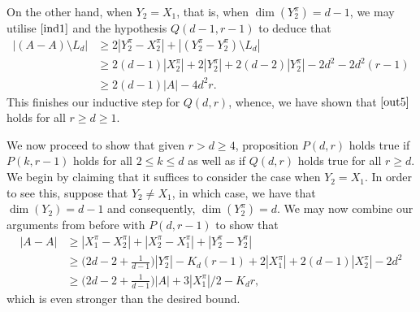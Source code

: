 On the other hand, when $Y_2 = X_1$, that is, when $\dim(Y_2^{\pi}) = d-1$, we may utilise $\eqref{ind1}$ and the hypothesis $Q(d-1,r-1)$ to deduce that
 \begin{align*}
 |(A-A) \setminus L_d| & \geq 2|Y_2^{\pi} - X_2^{\pi}| + |(Y_2^{\pi} - Y_2^{\pi})\setminus L_d| \\
 & \geq 2(d-1)|X_2^{\pi}| + 2|Y_2^{\pi}| + 2(d-2)|Y_2^{\pi}| - 2d^2 - 2d^2(r-1)  \\
 & \geq 2(d-1) |A| - 4d^2r.
 \end{align*}
This finishes our inductive step for $Q(d,r)$, whence, we have shown that $\eqref{out5}$ holds for all $r \geq d \geq 1$.
\par
 
We now proceed to show that given $r > d \geq 4$, proposition $P(d,r)$ holds true if $P(k,r-1)$ holds for all $2 \leq k \leq d$ as well as if $Q(d,r)$ holds true for all $r\geq d$. We begin by claiming that it suffices to consider the case when $Y_2 = X_1$. In order to see this, suppose that $Y_2 \neq X_1$, in which case, we have that $\dim(Y_2) = d-1$ and consequently, $\dim(Y_2^{\pi}) = d$. We may now combine our arguments from before with $P(d,r-1)$ to show that
\begin{align*}
|A-A| & \geq  | X_1^{\pi} - X_2^{\pi}| + | X_2^{\pi} - X_1^{\pi}| + |Y_2^{\pi} - Y_2^{\pi}| \\
        & \geq \bigg(2d - 2 + \frac{1}{d-1}\bigg)|Y_2^{\pi}| - K_{d}(r-1) + 2|X_1^{\pi}|  + 2(d-1)|X_2^{\pi}|  - 2d^2 \\
        & \geq \bigg(2d - 2 + \frac{1}{d-1}\bigg)|A|  + 3|X_1^{\pi}|/2 - K_d r,
\end{align*} 
which is even stronger than the desired bound.
\par

